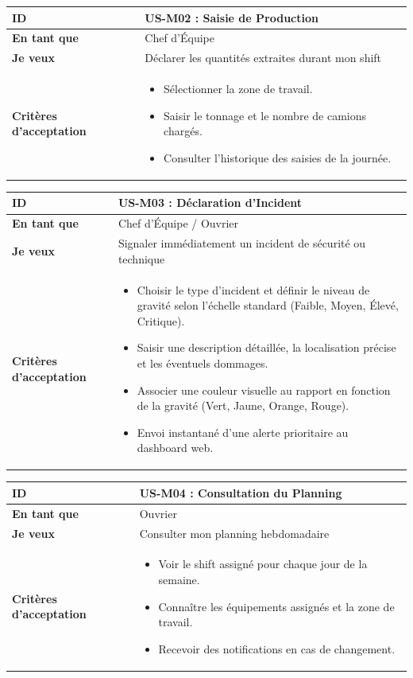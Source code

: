 \documentclass[12pt,a4paper]{article}
\begin{document}
\begin{longtable}{|p{3cm}|p{12cm}|}
\hline
\textbf{ID} & \textbf{US-M02 : Saisie de Production} \\ \hline
\textbf{En tant que} & Chef d'Équipe \\ \hline
\textbf{Je veux} & Déclarer les quantités extraites durant mon shift \\ \hline
\textbf{Critères d'acceptation} & 
\begin{itemize}[nosep, leftmargin=*]
    \item Sélectionner la zone de travail.
    \item Saisir le tonnage et le nombre de camions chargés.
    \item Consulter l'historique des saisies de la journée.
\end{itemize} \\ \hline
\end{longtable}

\begin{longtable}{|p{3cm}|p{12cm}|}
\hline
\textbf{ID} & \textbf{US-M03 : Déclaration d'Incident} \\ \hline
\textbf{En tant que} & Chef d'Équipe / Ouvrier \\ \hline
\textbf{Je veux} & Signaler immédiatement un incident de sécurité ou technique \\ \hline
\textbf{Critères d'acceptation} & 
\begin{itemize}[nosep, leftmargin=*]
    \item Choisir le type d'incident et définir le niveau de gravité selon l'échelle standard (Faible, Moyen, Élevé, Critique).
    \item Saisir une description détaillée, la localisation précise et les éventuels dommages.
    \item Associer une couleur visuelle au rapport en fonction de la gravité (Vert, Jaune, Orange, Rouge).
    \item Envoi instantané d'une alerte prioritaire au dashboard web.
\end{itemize} \\ \hline
\end{longtable}

\begin{longtable}{|p{3cm}|p{12cm}|}
\hline
\textbf{ID} & \textbf{US-M04 : Consultation du Planning} \\ \hline
\textbf{En tant que} & Ouvrier \\ \hline
\textbf{Je veux} & Consulter mon planning hebdomadaire \\ \hline
\textbf{Critères d'acceptation} & 
\begin{itemize}[nosep, leftmargin=*]
    \item Voir le shift assigné pour chaque jour de la semaine.
    \item Connaître les équipements assignés et la zone de travail.
    \item Recevoir des notifications en cas de changement.
\end{itemize} \\ \hline
\end{longtable}
\end{document}
